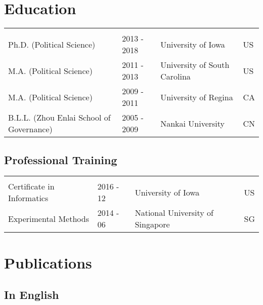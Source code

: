 \documentclass[
  12pt,
]
{article}
\begin{document}
\section{Education}\label{education}

\begin{longtable*}[t]{llll}

 &  &  & \\

Ph.D. (Political Science) & 2013 - 2018 & University of Iowa & US\\
M.A. (Political Science) & 2011 - 2013 & University of South Carolina & US\\
M.A. (Political Science) & 2009 - 2011 & University of Regina & CA\\
B.L.L. (Zhou Enlai School of Governance) & 2005 - 2009 & Nankai University & CN\\

\end{longtable*}

\subsection{Professional Training}\label{professional-training}

\begin{longtable*}[t]{llll}

 &  &  & \\

Certificate in Informatics & 2016 - 12 & University of Iowa & US\\
Experimental Methods & 2014 - 06 & National University of Singapore & SG\\

\end{longtable*}

\section{Publications}\label{publications}

\subsection{In English}\label{in-english}
\end{document}
